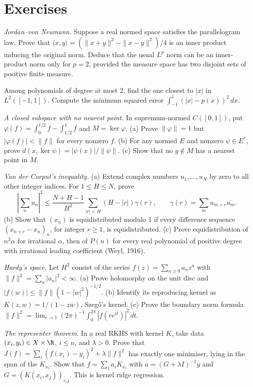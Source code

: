 \section{Exercises}

\begin{exercise}[$\star\star$]\label{ex:jvn}
\emph{Jordan--von Neumann.} Suppose a real normed space satisfies the parallelogram law. Prove that $\langle x,y\rangle=(\|x+y\|^2-\|x-y\|^2)/4$ is an inner product inducing the original norm. Deduce that the usual $L^p$ norm can be an inner-product norm only for $p=2$, provided the measure space has two disjoint sets of positive finite measure.
\end{exercise}
\begin{exercise}[$\star$]\label{ex:legendrefit}
Among polynomials of degree at most $2$, find the one closest to $|x|$ in $L^2([-1,1])$. Compute the minimum squared error $\int_{-1}^1(|x|-p(x))^2\,dx$.
\end{exercise}
\begin{exercise}[$\star\star$]\label{ex:noclosest}
\emph{A closed subspace with no nearest point.} In supremum-normed $C([0,1])$, put $\varphi(f)=\int_0^{1/2}f-\int_{1/2}^1f$ and $M=\ker\varphi$. (a) Prove $\|\varphi\|=1$ but $|\varphi(f)|<\|f\|$ for every nonzero $f$. (b) For any normed $E$ and nonzero $\psi\in E^*$, prove $d(x,\ker\psi)=|\psi(x)|/\|\psi\|$. (c) Show that no $g\notin M$ has a nearest point in $M$.
\end{exercise}
\begin{exercise}[$\star\star\star$]\label{ex:vandercorput}
\emph{Van der Corput's inequality.} (a) Extend complex numbers $u_1,\dots,u_N$ by zero to all other integer indices. For $1\le H\le N$, prove
\[\left|\sum_nu_n\right|^2\le\frac{N+H-1}{H^2}\sum_{|r|<H}(H-|r|)\gamma(r),\qquad\gamma(r)=\sum_mu_{m+r}\overline{u_m}.\]
(b) Show that $(x_n)$ is equidistributed modulo $1$ if every difference sequence $(x_{n+r}-x_n)_n$, for integer $r\ge1$, is equidistributed. (c) Prove equidistribution of $n^2\alpha$ for irrational $\alpha$, then of $P(n)$ for every real polynomial of positive degree with irrational leading coefficient (Weyl, 1916).
\end{exercise}
\begin{exercise}[$\star\star$]\label{ex:hardy2}
\emph{Hardy's space.} Let $H^2$ consist of the series $f(z)=\sum_{n\ge0}a_nz^n$ with $\|f\|^2=\sum_n|a_n|^2<\infty$. (a) Prove holomorphy on the unit disc and $|f(w)|\le\|f\|(1-|w|^2)^{-1/2}$. (b) Identify its reproducing kernel as $K(z,w)=1/(1-z\overline w)$, Szeg\H o's kernel. (c) Prove the boundary norm formula $\|f\|^2=\lim_{r\to1}(2\pi)^{-1}\int_0^{2\pi}|f(re^{it})|^2\,dt$.
\end{exercise}
\begin{exercise}[$\star\star$]\label{ex:representer}
\emph{The representer theorem.} In a real RKHS with kernel $K$, take data $(x_i,y_i)\in X\times\R$, $i\le n$, and $\lambda>0$. Prove that $J(f)=\sum_i(f(x_i)-y_i)^2+\lambda\|f\|^2$ has exactly one minimiser, lying in the span of the $K_{x_i}$. Show that $f=\sum_ia_iK_{x_i}$ with $a=(G+\lambda I)^{-1}y$ and $G=(K(x_i,x_j))_{i,j}$. This is kernel ridge regression.
\end{exercise}

